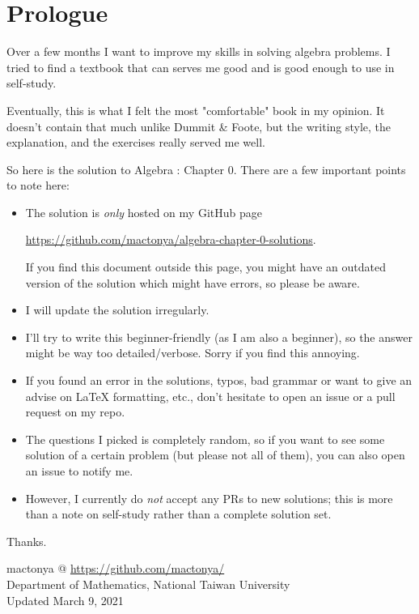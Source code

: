\thispagestyle{empty}
\begin{center}
\end{center}
    
\newpage

\chapter{Prologue}
Over a few months I want to improve my skills in solving algebra problems. I tried to find a textbook that can serves me good and is good enough to use in self-study. 

Eventually, this is what I felt the most "comfortable" book in my opinion. It doesn't contain that much unlike Dummit \& Foote, but the writing style, the explanation, and the exercises really served me well.

So here is the solution to Algebra : Chapter 0. There are a few important points to note here:
\begin{itemize}
	\item The solution is \emph{only} hosted on my GitHub page 
	\begin{center}
		\href{https://github.com/mactonya/algebra-chapter-0-solutions}{https://github.com/mactonya/algebra-chapter-0-solutions}.
	\end{center} 
	If you find this document outside this page, you might have an outdated version of the solution which might have errors, so please be aware.
    \item I will update the solution irregularly.
    \item I'll try to write this beginner-friendly (as I am also a beginner), so the answer might be way too detailed/verbose. Sorry if you find this annoying. 
    \item If you found an error in the solutions, typos, bad grammar or want to give an advise on LaTeX formatting, etc., don't hesitate to open an issue or a pull request on my repo. 
    \item The questions I picked is completely random, so if you want to see some solution of a certain problem (but please not all of them), you can also open an issue to notify me. 
    \item However, I currently do \emph{not} accept any PRs to new solutions; this is more than a note on self-study rather than a complete solution set.
\end{itemize}

Thanks. 

\begin{flushright}
mactonya @ \href{https://github.com/mactonya/}{https://github.com/mactonya/} \\
Department of Mathematics, National Taiwan University \\
Updated March 9, 2021
\end{flushright}
